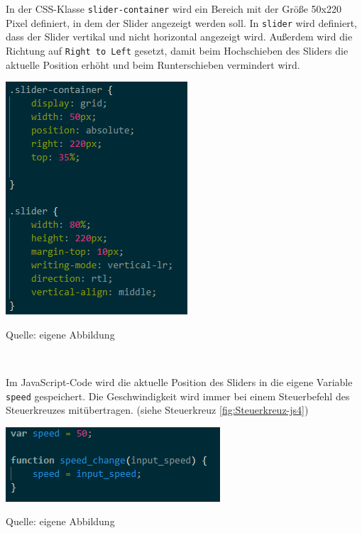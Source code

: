 \documentclass[ngerman,12pt,a4paper]{article}
\begin{document}
	In der CSS-Klasse \texttt{slider-container} wird ein Bereich mit der Größe 50x220 Pixel definiert, in dem der Slider angezeigt werden soll. In \texttt{slider} wird definiert, dass der Slider vertikal und nicht horizontal angezeigt wird. Außerdem wird die Richtung auf \texttt{Right to Left} gesetzt, damit beim Hochschieben des Sliders die aktuelle Position erhöht und beim Runterschieben vermindert wird. \\
	\begin{center}
		\begin{minipage}[t]{0.45\textwidth}
			\includegraphics{Pictures/speed-css}
			\label{fig:speed-css}
			\vspace{-10pt}
			\begin{center}
				\par\small Quelle: eigene Abbildung 
			\end{center}
		\end{minipage} \\[1.5cm]
	\end{center}
	Im JavaScript-Code wird die aktuelle Position des Sliders in die eigene Variable \texttt{speed} gespeichert. Die Geschwindigkeit wird immer bei einem Steuerbefehl des Steuerkreuzes mitübertragen. (siehe Steuerkreuz  \ref{fig:Steuerkreuz-js4})
	\begin{center}
		\begin{minipage}[t]{0.55\textwidth}
			\includegraphics{Pictures/speed-js}
			\label{fig:speed-js}
			\vspace{-10pt}
			\begin{center}
				\par\small Quelle: eigene Abbildung 
			\end{center}
		\end{minipage} \\[0.75cm]
	\end{center}
				
\end{document}
